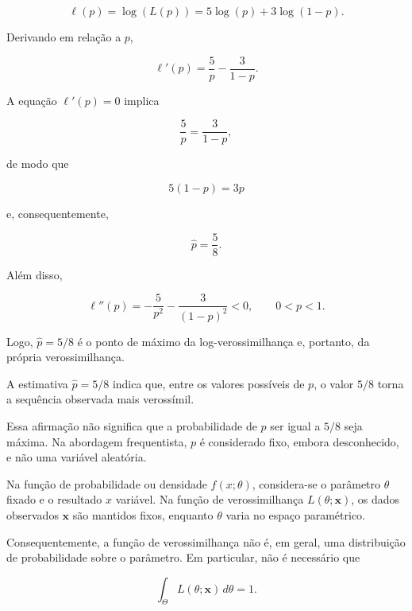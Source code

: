 \documentclass[
  letterpaper,
  DIV=11,
  numbers=noendperiod]{scrreprt}
\begin{document}
\[\ell(p) = \log(L(p)) = 5 \log(p) + 3\log(1-p).\]

Derivando em relação a \(p\),

\[\ell'(p)
=
\frac{5}{p}
-
\frac{3}{1-p}.\]

A equação \(\ell'(p)=0\) implica

\[\frac{5}{p}
=
\frac{3}{1-p},\]

de modo que

\[5(1-p)=3p\]

e, consequentemente,

\[\widehat p
=
\frac{5}{8}.\]

Além disso,

\[\ell''(p)
=
-\frac{5}{p^2}
-\frac{3}{(1-p)^2}
<0,
\qquad 0<p<1.\]

Logo, \(\widehat p=5/8\) é o ponto de máximo da log-verossimilhança e,
portanto, da própria verossimilhança.

\begin{tcolorbox}[enhanced jigsaw, colback=white, leftrule=.75mm, colbacktitle=quarto-callout-note-color!10!white, breakable, titlerule=0mm, bottomtitle=1mm, title=\textcolor{quarto-callout-note-color}{\faInfo}\hspace{0.5em}{Interpretação}, colframe=quarto-callout-note-color-frame, toprule=.15mm, opacityback=0, bottomrule=.15mm, opacitybacktitle=0.6, arc=.35mm, toptitle=1mm, rightrule=.15mm, coltitle=black, left=2mm]

A estimativa \(\widehat p=5/8\) indica que, entre os valores possíveis
de \(p\), o valor \(5/8\) torna a sequência observada mais verossímil.

Essa afirmação não significa que a probabilidade de \(p\) ser igual a
\(5/8\) seja máxima. Na abordagem frequentista, \(p\) é considerado
fixo, embora desconhecido, e não uma variável aleatória.

\end{tcolorbox}

\begin{tcolorbox}[enhanced jigsaw, colback=white, leftrule=.75mm, colbacktitle=quarto-callout-warning-color!10!white, breakable, titlerule=0mm, bottomtitle=1mm, title=\textcolor{quarto-callout-warning-color}{\faExclamationTriangle}\hspace{0.5em}{Probabilidade e verossimilhança}, colframe=quarto-callout-warning-color-frame, toprule=.15mm, opacityback=0, bottomrule=.15mm, opacitybacktitle=0.6, arc=.35mm, toptitle=1mm, rightrule=.15mm, coltitle=black, left=2mm]

Na função de probabilidade ou densidade \(f(x;\theta)\), considera-se o
parâmetro \(\theta\) fixado e o resultado \(x\) variável. Na função de
verossimilhança \(L(\theta;\mathbf{x})\), os dados observados
\(\mathbf{x}\) são mantidos fixos, enquanto \(\theta\) varia no espaço
paramétrico.

Consequentemente, a função de verossimilhança não é, em geral, uma
distribuição de probabilidade sobre o parâmetro. Em particular, não é
necessário que

\[\int_\Theta L(\theta;\mathbf{x})\,d\theta=1.\]

\end{tcolorbox}
\end{document}
